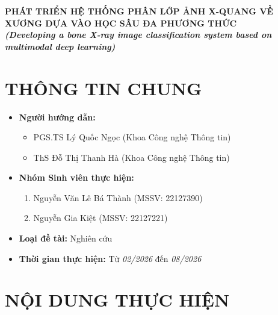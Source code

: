 \begin{refsection}
\begin{center}
\textbf{\Large PHÁT TRIỂN HỆ THỐNG PHÂN LỚP ẢNH X-QUANG VỀ XƯƠNG DỰA VÀO HỌC SÂU ĐA PHƯƠNG THỨC}
      \\

\vspace{.5cm} \textit{\textbf{\large (Developing a bone X-ray image classification system based on multimodal deep learning)}}
  \end{center}

  \section{THÔNG TIN CHUNG}
  \begin{itemize}[label = {}]

      \item \textbf{Người hướng dẫn:}
      \begin{itemize}
          \item PGS.TS Lý Quốc Ngọc (Khoa Công nghệ Thông tin)
          \item ThS Đỗ Thị Thanh Hà (Khoa Công nghệ Thông tin)
      \end{itemize}{}


      \item \textbf{Nhóm Sinh viên thực hiện:}

      \begin{enumerate}
          \item Nguyễn Văn Lê Bá Thành (MSSV: 22127390)
          \item Nguyễn Gia Kiệt (MSSV: 22127221)
      \end{enumerate}

      \item \textbf{Loại đề tài:} Nghiên cứu

      \item \textbf{Thời gian thực hiện:} Từ \textit{02/2026} đến \textit{08/2026}


  \end{itemize}

\pagebreak

  \section{NỘI DUNG THỰC HIỆN}



\end{refsection}
